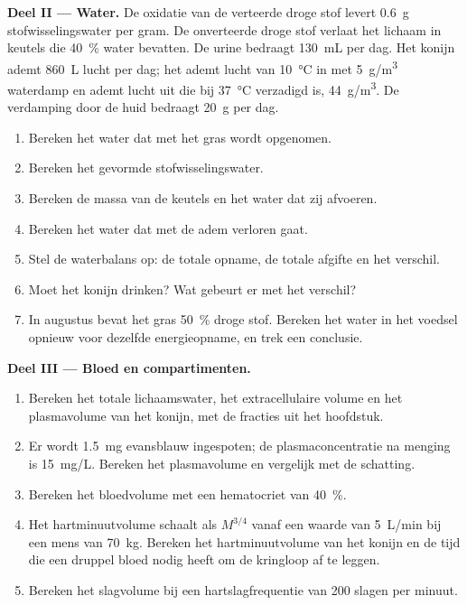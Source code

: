 \begin{problem}
\medskip
\noindent\textbf{Deel II --- Water.}
De oxidatie van de verteerde droge stof levert \qty{0.6}{g} stofwisselingswater
per gram. De onverteerde droge stof verlaat het lichaam in keutels die
\qty{40}{\%} water bevatten. De urine bedraagt \qty{130}{mL} per dag. Het
konijn ademt \qty{860}{L} lucht per dag; het ademt lucht van \qty{10}{\celsius}
in met \qty{5}{g/m^3} waterdamp en ademt lucht uit die bij
\qty{37}{\celsius} verzadigd is, \qty{44}{g/m^3}. De verdamping door de huid
bedraagt \qty{20}{g} per dag.
\begin{enumerate}[resume]
  \item Bereken het water dat met het gras wordt opgenomen.
  \item Bereken het gevormde stofwisselingswater.
  \item Bereken de massa van de keutels en het water dat zij afvoeren.
  \item Bereken het water dat met de adem verloren gaat.
  \item Stel de waterbalans op: de totale opname, de totale afgifte en het
        verschil.
  \item Moet het konijn drinken? Wat gebeurt er met het verschil?
  \item In augustus bevat het gras \qty{50}{\%} droge stof. Bereken het
        water in het voedsel opnieuw voor dezelfde energieopname, en trek
        een conclusie.
\end{enumerate}

\medskip
\noindent\textbf{Deel III --- Bloed en compartimenten.}
\begin{enumerate}[resume]
  \item Bereken het totale lichaamswater, het extracellulaire volume en
        het plasmavolume van het konijn, met de fracties uit het
        hoofdstuk.
  \item Er wordt \qty{1.5}{mg} evansblauw ingespoten; de
        plasmaconcentratie na menging is \qty{15}{mg/L}. Bereken het
        plasmavolume en vergelijk met de schatting.
  \item Bereken het bloedvolume met een hematocriet van \qty{40}{\%}.
  \item Het hartminuutvolume schaalt als $M^{3/4}$ vanaf een waarde van
        \qty{5}{L/min} bij een mens van \qty{70}{kg}. Bereken het
        hartminuutvolume van het konijn en de tijd die een druppel bloed
        nodig heeft om de kringloop af te leggen.
  \item Bereken het slagvolume bij een hartslagfrequentie van
        \qty{200}{} slagen per minuut.
\end{enumerate}


\end{problem}
